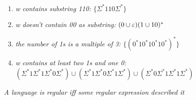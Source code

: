 \documentclass{article}
\begin{document}
\begin{exercises}
    \

    \begin{enumerate}
        \item \textit{w contains substring 110: $\{\Sigma^*110\Sigma^*\}$}
        \item \textit{w doesn't contain 00 as substring: $(0\cup\varepsilon)(1\cup10)^*$}
        \item \textit{the number of 1s is a multiple of 3: $\{(0^*10^*10^*10^*)^*\}$}
        \item \textit{w contains at least two 1s and one 0: $(\Sigma^*1\Sigma^*1\Sigma^*0\Sigma^*)\cup(\Sigma^*1\Sigma^*0\Sigma^*1\Sigma^*)\cup(\Sigma^*0\Sigma^*1\Sigma^*1\Sigma^*)$}
    \end{enumerate}
\end{exercises}

\begin{thm}
    \textit{A language is regular iff some regular expression described it}
\end{thm}
\end{document}
